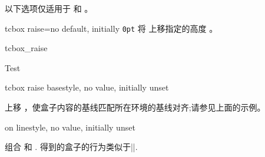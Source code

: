 以下选项仅适用于  和 。
\begin{docTcbKey}{tcbox raise}{=}{no default, initially \texttt{0pt}}
  将  上移指定的高度 。
\begin{exdispExample}{tcbox_raise}

Test\dotfill
{}\dotfill
{}\dotfill
{}
\end{exdispExample}
\end{docTcbKey}



\begin{docTcbKey}{tcbox raise base}{}{style, no value, initially unset}

上移  ，使盒子内容的基线匹配所在环境的基线对齐;请参见上面的示例。
\end{docTcbKey}

\begin{docTcbKey}{on line}{}{style, no value, initially unset}

组合  和 .
得到的盒子的行为类似于|\fbox|.
\end{docTcbKey}





